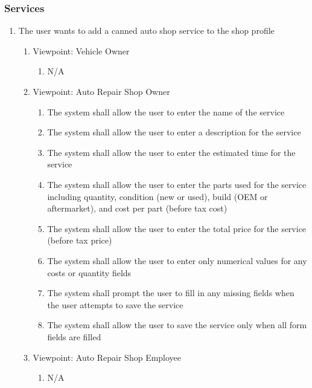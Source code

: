 \documentclass[12pt]{article}
\begin{document}
\subsubsection{Services}
\begin{enumerate}[resume*=business_events]
	\item The user wants to add a canned auto shop service to the shop profile
	      \begin{enumerate}[VP\arabic*.]
		      \item Viewpoint: Vehicle Owner
		            \begin{enumerate}
			            \item[] N/A
		            \end{enumerate}
		      \item Viewpoint: Auto Repair Shop Owner
		            \begin{enumerate}
			            \item The system shall allow the user to enter the name of the service
			            \item The system shall allow the user to enter a description for the service
			            \item The system shall allow the user to enter the estimated time for the service
			            \item The system shall allow the user to enter the parts used for the service including quantity,
			                  condition (new or used), build (OEM or aftermarket), and cost per part (before tax cost)
			            \item The system shall allow the user to enter the total price for the service (before tax price)
			            \item The system shall allow the user to enter only numerical values for any costs or quantity fields
			            \item The system shall prompt the user to fill in any missing fields when the user attempts to save the
			                  service
			            \item The system shall allow the user to save the service only when all form fields are filled
		            \end{enumerate}
		      \item Viewpoint: Auto Repair Shop Employee
		            \begin{enumerate}
			            \item[] N/A
		            \end{enumerate}
	      \end{enumerate}


\end{enumerate}
\end{document}
